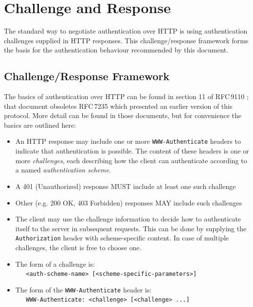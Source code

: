 \documentclass[11pt,a4paper]{ivoa}
\newcommand{\rfc}[1]{RFC\,#1}
\newcommand{\header}[1]{{\tt #1}}
\begin{document}
\section{Challenge and Response}
\label{sec:challenge-response}

The standard way to negotiate authentication over HTTP is using
authentication challenges supplied in HTTP responses.
This challenge/response framework forms the basis for the
authentication behaviour recommended by this document.

\subsection{Challenge/Response Framework}
\label{sec:challenge-response-details}

The basics of authentication over HTTP can be found in
section 11 of \rfc{9110} \citep{std:RFC9110};
that document obsoletes \rfc{7235} \citep{std:RFC7235}
which presented an earlier version of this protocol.
More detail can be found in those documents, but for convenience
the basics are outlined here:
\begin{itemize}
  \item An HTTP response may include one or more
        \header{WWW-Authenticate} headers
        to indicate that authentication is possible.
        The content of these headers is one or more {\em challenges},
        each describing how the client can authenticate according
        to a named {\em authentication scheme}.
  \item A 401 (Unauthorized) response MUST include at least one such challenge
  \item Other (e.g. 200 OK, 403 Forbidden) responses
        MAY include such challenges
  \item The client may use the challenge information to decide how
        to authenticate itself to the server in subsequent requests.
        This can be done by supplying the \header{Authorization} header
        with scheme-specific content.
        In case of multiple challenges, the client is free to choose one.
  \item The form of a challenge is:\\
        \verb|   <auth-scheme-name> [<scheme-specific-parameters>]|
  \item The form of the \header{WWW-Authenticate} header is:\\
        \verb|   WWW-Authenticate: <challenge> [<challenge> ...]|
\end{itemize}
\end{document}
